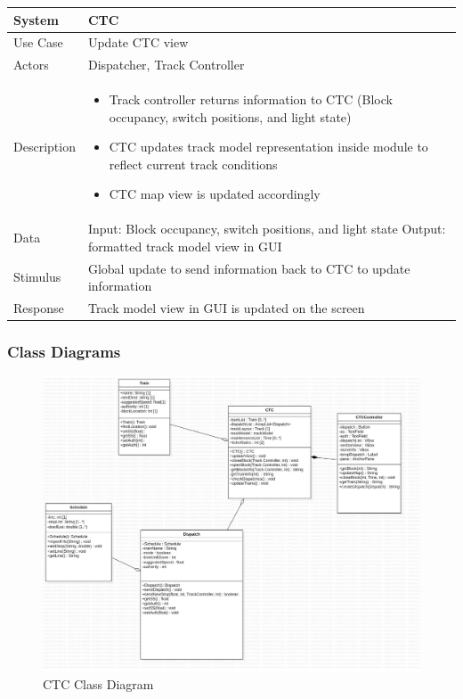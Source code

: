 \documentclass{article}
\begin{document}
    \begin{longtable}{
    || >{\raggedright\arraybackslash}m{}
    | >{\raggedright\arraybackslash}m{}||}
    \hline
    \textbf{System} & \textbf{CTC} \\
    \hline
    Use Case & Update CTC view\\
    \hline
    Actors & Dispatcher, Track Controller\\
    \hline
    Description & \begin{itemize}
        \item Track controller returns information to CTC (Block occupancy, switch positions, and light state)
        \item CTC updates track model representation inside module to reflect current track conditions
        \item CTC map view is updated accordingly
    \end{itemize}\\
    \hline
    Data & Input: Block occupancy, switch positions, and light state \newline Output: formatted track model view in GUI\\
    \hline
    Stimulus & Global update to send information back to CTC to update information\\
    \hline
    Response & Track model view in GUI is updated on the screen\\
    \hline
    \end{longtable}
    \subsubsection{Class Diagrams}
    \begin{figure}[H]
        \centering
        \includegraphics[width=\textwidth]{./CTC/CTC_Class_Diagram.png}
        \caption{CTC Class Diagram}
        \label{fig:CTC Class Diagram}
    \end{figure}
\end{document}
